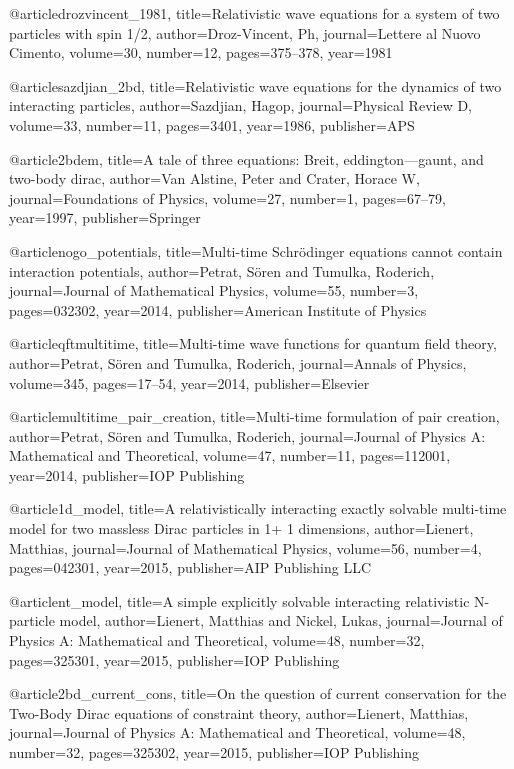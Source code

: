 @article{drozvincent_1981,
  title={Relativistic wave equations for a system of two particles with spin 1/2},
  author={Droz-Vincent, Ph},
  journal={Lettere al Nuovo Cimento},
  volume={30},
  number={12},
  pages={375--378},
  year={1981}
}

@article{sazdjian_2bd,
  title={Relativistic wave equations for the dynamics of two interacting particles},
  author={Sazdjian, Hagop},
  journal={Physical Review D},
  volume={33},
  number={11},
  pages={3401},
  year={1986},
  publisher={APS}
}

@article{2bdem,
  title={A tale of three equations: Breit, eddington—gaunt, and two-body dirac},
  author={Van Alstine, Peter and Crater, Horace W},
  journal={Foundations of Physics},
  volume={27},
  number={1},
  pages={67--79},
  year={1997},
  publisher={Springer}
}

@article{nogo_potentials,
  title={Multi-time Schr{\"o}dinger equations cannot contain interaction potentials},
  author={Petrat, S{\"o}ren and Tumulka, Roderich},
  journal={Journal of Mathematical Physics},
  volume={55},
  number={3},
  pages={032302},
  year={2014},
  publisher={American Institute of Physics}
}

@article{qftmultitime,
  title={Multi-time wave functions for quantum field theory},
  author={Petrat, S{\"o}ren and Tumulka, Roderich},
  journal={Annals of Physics},
  volume={345},
  pages={17--54},
  year={2014},
  publisher={Elsevier}
}

@article{multitime_pair_creation,
  title={Multi-time formulation of pair creation},
  author={Petrat, S{\"o}ren and Tumulka, Roderich},
  journal={Journal of Physics A: Mathematical and Theoretical},
  volume={47},
  number={11},
  pages={112001},
  year={2014},
  publisher={IOP Publishing}
}

@article{1d_model,
  title={A relativistically interacting exactly solvable multi-time model for two massless Dirac particles in 1+ 1 dimensions},
  author={{Lienert, Matthias}},
  journal={Journal of Mathematical Physics},
  volume={56},
  number={4},
  pages={042301},
  year={2015},
  publisher={AIP Publishing LLC}
}

@article{nt_model,
  title={A simple explicitly solvable interacting relativistic N-particle model},
  author={Lienert, Matthias and Nickel, Lukas},
  journal={Journal of Physics A: Mathematical and Theoretical},
  volume={48},
  number={32},
  pages={325301},
  year={2015},
  publisher={IOP Publishing}
}

@article{2bd_current_cons,
  title={On the question of current conservation for the Two-Body Dirac equations of constraint theory},
  author={Lienert, Matthias},
  journal={Journal of Physics A: Mathematical and Theoretical},
  volume={48},
  number={32},
  pages={325302},
  year={2015},
  publisher={IOP Publishing}
}

